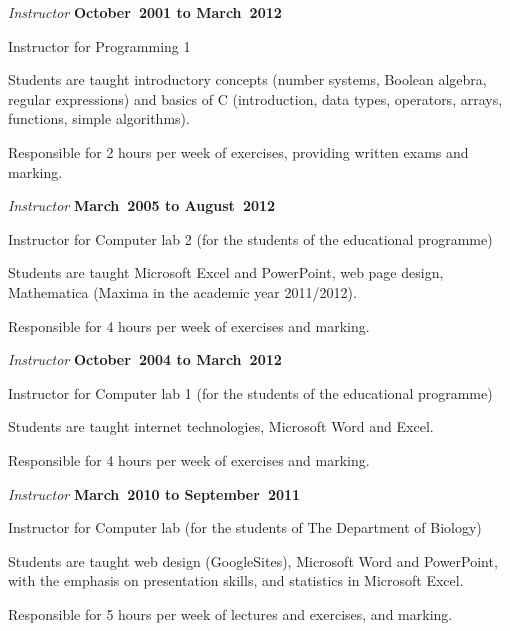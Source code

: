 \documentclass[10pt]{article}
\begin{document}
\begin{outerlist}
\item[] \textit{Instructor} \hfill \textbf{October~2001 to March~2012}
  \begin{innerlist}
    \item Instructor for Programming 1
      \begin{innerlist}
        \item Students are taught introductory concepts (number systems, Boolean algebra, regular expressions) and basics of C (introduction, data types, operators, arrays, functions, simple algorithms).
        \item Responsible for 2 hours per week of exercises, providing written exams and marking.
      \end{innerlist}
  \end{innerlist}

\item[] \textit{Instructor} \hfill \textbf{March~2005 to August~2012}
  \begin{innerlist}
    \item Instructor for Computer lab 2 (for the students of the educational programme)
      \begin{innerlist}
        \item Students are taught Microsoft Excel and PowerPoint, web page design, Mathematica (Maxima in the academic year 2011/2012).
        \item Responsible for 4 hours per week of exercises and marking.
      \end{innerlist}
  \end{innerlist}

\item[] \textit{Instructor} \hfill \textbf{October~2004 to March~2012}
  \begin{innerlist}
    \item Instructor for Computer lab 1 (for the students of the educational programme)
      \begin{innerlist}
        \item Students are taught internet technologies, Microsoft Word and Excel.
        \item Responsible for 4 hours per week of exercises and marking.
      \end{innerlist}
  \end{innerlist}

\item[] \textit{Instructor} \hfill \textbf{March~2010 to September~2011}
  \begin{innerlist}
    \item Instructor for Computer lab (for the students of The Department of Biology)
      \begin{innerlist}
        \item Students are taught web design (GoogleSites), Microsoft Word and PowerPoint, with the emphasis on presentation skills, and statistics in Microsoft Excel.
        \item Responsible for 5 hours per week of lectures and exercises, and marking.
      \end{innerlist}
  \end{innerlist}


\end{outerlist}
\end{document}
